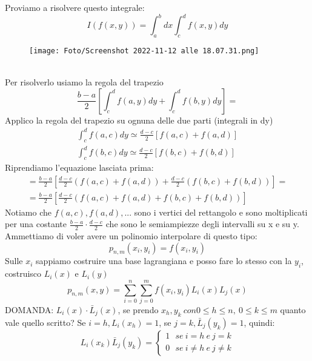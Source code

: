 \documentclass[a4paper, portrait]{book}
\numberwithin{equation}{chapter} %
\begin{document}
\newpage
Proviamo a risolvere questo integrale: 
\begin{equation}
    I(f(x,y)) = \int_a^b dx \int_c^d f(x,y)dy
\end{equation}
\begin{figure}[h!]
    \centering
    \texttt{[image: Foto/Screenshot 2022-11-12 alle 18.07.31.png]}
    \caption{}
\end{figure}
\\Per risolverlo usiamo la regola del trapezio
\begin{equation}
    \frac{b-a}{2}\left[\int_c^d f(a,y) dy + \int_c^d f(b,y)dy\right] =
\end{equation}
Applico la regola del trapezio su ognuna delle due parti (integrali in dy)
\begin{gather}
    \int_c^d f(a,c) dy \simeq \frac{d-c}{2}\left[f(a,c)+f(a,d)\right]\\
    \int_c^d f(b,c) dy \simeq \frac{d-c}{2}\left[f(b,c)+f(b,d)\right]
\end{gather}
Riprendiamo l'equazione lasciata prima:
\begin{gather}
    = \frac{b-a}{2}\left[\frac{d-c}{2}(f(a,c)+f(a,d))+ \frac{d-c}{2}(f(b,c)+f(b,d))\right] = \\
    = \frac{b-a}{2}\left[\frac{d-c}{2}\left(f(a,c)+f(a,d)+f(b,c)+f(b,d)\right)\right]
\end{gather}
Notiamo che $f(a,c), f(a,d),...$ sono i vertici del rettangolo e sono moltiplicati per una costante $\frac{b-a}{2} \cdot \frac{d-c}{2}$ che sono le semiampiezze degli intervalli su x e su y.\\
\newpage
Ammettiamo di voler avere un polinomio interpolare di questo tipo:
\begin{equation}
    p_{n,m}(x_i,y_i) = f(x_i,y_i)
\end{equation}
Sulle $x_i$ sappiamo costruire una base lagrangiana e posso fare lo stesso con la $y_i$, costruisco $L_i(x)$ e $L_i(y)$
\begin{equation}
    p_{n,m} (x,y) = \sum_{i=0}^{n}\sum_{j= 0}^{m} f(x_i,y_i)L_i(x)L_j(x)
\end{equation}
DOMANDA: $L_i(x) \cdot \bar{L}_j(x)$, se prendo $x_h,y_k \ con 0 \leq h \leq n, \ 0 \leq k \leq m$ quanto vale quello scritto?
Se $i = h, L_i(x_h) = 1$, se $j = k, \bar{L}_j(y_k) = 1$, quindi:
\begin{equation}
    L_i(x_k)\bar{L}_j(y_k) = \begin{cases}
        1 \ \ \ se \ i = h \ e \ j = k\\
        0 \ \ \ se \ i\neq h \ e \ j \neq k
    \end{cases}
\end{equation}
\end{document}
